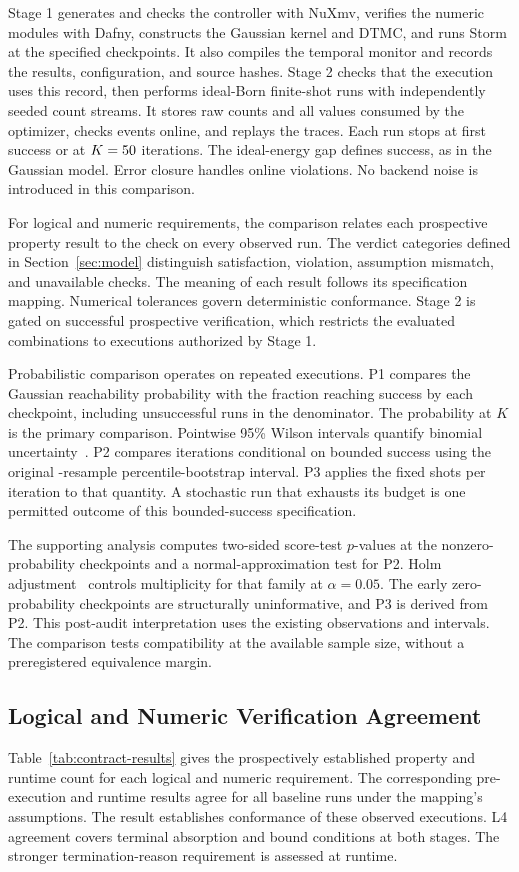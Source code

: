 \documentclass[conference]{IEEEtran}
\begin{document}
Stage 1 generates and checks the controller with NuXmv, verifies the numeric modules with Dafny, constructs the Gaussian kernel and DTMC, and runs Storm at the specified checkpoints. It also compiles the temporal monitor and records the results, configuration, and source hashes. Stage 2 checks that the execution uses this record, then performs \BaselineRuns ideal-Born finite-shot runs with independently seeded count streams. It stores raw counts and all values consumed by the optimizer, checks events online, and replays the traces. Each run stops at first success or at $K=50$ iterations. The ideal-energy gap defines success, as in the Gaussian model. Error closure handles online violations. No backend noise is introduced in this comparison.

For logical and numeric requirements, the comparison relates each prospective property result to the check on every observed run. The verdict categories defined in Section~\ref{sec:model} distinguish satisfaction, violation, assumption mismatch, and unavailable checks. The meaning of each result follows its specification mapping. Numerical tolerances govern deterministic conformance. Stage 2 is gated on successful prospective verification, which restricts the evaluated combinations to executions authorized by Stage 1.

Probabilistic comparison operates on repeated executions. P1 compares the Gaussian reachability probability with the fraction reaching success by each checkpoint, including unsuccessful runs in the denominator. The probability at $K$ is the primary comparison. Pointwise 95\% Wilson intervals quantify binomial uncertainty~\cite{wilson}. P2 compares iterations conditional on bounded success using the original \BootstrapSamples-resample percentile-bootstrap interval. P3 applies the fixed shots per iteration to that quantity. A stochastic run that exhausts its budget is one permitted outcome of this bounded-success specification.

The supporting analysis computes two-sided score-test $p$-values at the nonzero-probability checkpoints and a normal-approximation test for P2. Holm adjustment~\cite{holm} controls multiplicity for that family at $\alpha=0.05$. The early zero-probability checkpoints are structurally uninformative, and P3 is derived from P2. This post-audit interpretation uses the existing observations and intervals. The comparison tests compatibility at the available sample size, without a preregistered equivalence margin.

\subsection{Logical and Numeric Verification Agreement}
Table~\ref{tab:contract-results} gives the prospectively established property and runtime count for each logical and numeric requirement. The corresponding pre-execution and runtime results agree for all \BaselineRuns baseline runs under the mapping's assumptions. The result establishes conformance of these observed executions. L4 agreement covers terminal absorption and bound conditions at both stages. The stronger termination-reason requirement is assessed at runtime.
\end{document}
